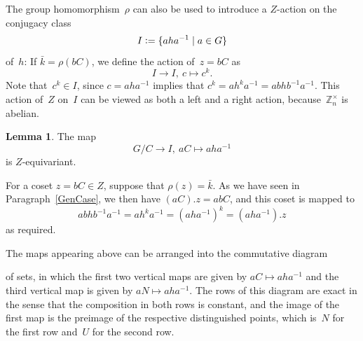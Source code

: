 \documentclass[12pt]{article}
\makeatletter
\theoremstyle{definition}
\newtheorem{Lemma}[Satz]{Lemma}
\theoremstyle{break}
\renewenvironment{proof}[1][\proofname]{\par
\vspace{-5pt}%
\pushQED{\qed}%
\normalfont
\topsep0pt \partopsep0pt %
\trivlist
\item[\hskip\labelsep
\bfseries
#1\@addpunct{.}]\ignorespaces
}{%
\popQED\endtrivlist\@endpefalse
\addvspace{6pt plus 6pt} %
}
\newcommand{\Z}{\mathbb{Z}}
\renewcommand{\1}{\mathbbm{1}}
\newcommand{\deq}{\vcentcolon =}
\makeatother
\begin{document}
The group homomorphism~$\rho$ can also be used to introduce a $Z$-action on the conjugacy class
\[I \deq \{a h a^{-1} \mid a \in G\}\]
of~$h$: If $\bar{k} = \rho(bC)$, we define the action of~$z=bC$ as
\[I \to I,~c \mapsto c^k.\]
Note that~$c^k \in I$, since $c = a h a^{-1}$ implies that
$c^k = a h^k a^{-1} = a b h b^{-1} a^{-1}$. This action of~$Z$ on~$I$ can be viewed as both a left and a right action, because~$\Z_n^\times$ is abelian.
\begin{Lemma} \label{Equiv}
The map
\[G/C \to I,~aC \mapsto a h a^{-1}\]
is $Z$-equivariant.
\end{Lemma}
\begin{proof}
For a coset $z = bC \in Z$, suppose that $\rho(z) = \bar{k}$. As we have seen in Paragraph~\ref{GenCase}, we then have
$(aC).z = abC$, and this coset is mapped to
\[a b h b^{-1} a^{-1} = a h^k a^{-1} = (a h a^{-1})^k = (a h a^{-1}).z\]
as required.
\end{proof}

The maps appearing above can be arranged into the commutative diagram
\begin{center}
\end{center}
of sets, in which the first two vertical maps are given by $aC \mapsto a h a^{-1}$ and the third vertical map is given by $aN \mapsto a h a^{-1}$. The rows of this diagram are exact in the sense that the composition in both rows is constant, and the image of the first map is the preimage of the respective distinguished points, which is~$N$ for the first row and~$U$ for the second row.
\end{document}
